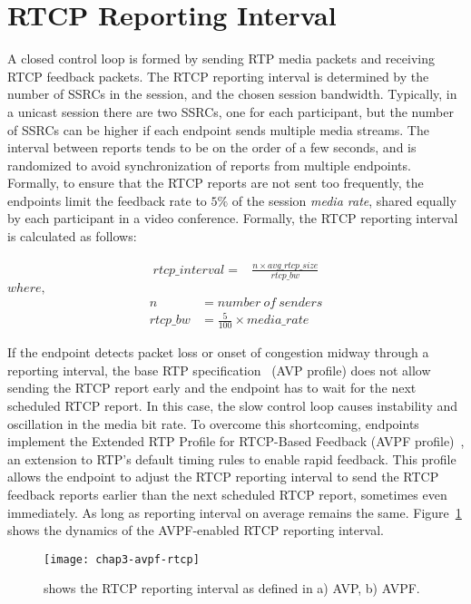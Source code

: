\section{RTCP Reporting Interval}

A closed control loop is formed by sending RTP media packets and receiving
RTCP feedback packets. The RTCP reporting interval is determined by the number
of SSRCs in the session, and the chosen session bandwidth. Typically, in a
unicast session there are two SSRCs, one for each participant, but the number
of SSRCs can be higher if each endpoint sends multiple media streams. The
interval between reports tends to be on the order of a few seconds, and is
randomized to avoid synchronization of reports from multiple endpoints.
Formally, to ensure that the RTCP reports are not sent too frequently, the
endpoints limit the feedback rate to $5\%$ of the session \textit{media rate},
shared equally by each participant in a video conference. Formally, the RTCP
reporting interval is calculated as follows:

\begin{align}
rtcp\_interval = & \frac{n \times avg\_rtcp\_size}{rtcp\_bw}
\label{eq:rtcp.int}
\end{align}
\hspace{35mm}$where,$
\begin{align*}
n &=  number\ of\ senders \\
rtcp\_bw &=  \frac{5}{100} \times media\_rate
\end{align*}



If the endpoint detects packet loss or onset of congestion midway through a
reporting interval, the base RTP specification~\cite{rfc3550} (AVP profile)
does not allow sending the RTCP report early and the endpoint has to wait for
the next scheduled RTCP report. In this case, the slow control loop causes
instability and oscillation in the media bit rate. To overcome this
shortcoming, endpoints implement the Extended RTP Profile for RTCP-Based
Feedback (AVPF profile)~\cite{rfc4585}, an extension to RTP's default timing
rules to enable rapid feedback. This profile allows the endpoint to adjust the
RTCP reporting interval to send the RTCP feedback reports earlier than the
next scheduled RTCP report, sometimes even immediately. As long as reporting
interval on average remains the same. Figure~\ref{fig:3:avpf.interval} shows
the dynamics of the AVPF-enabled RTCP reporting interval.

\begin{figure}[!h]
\centerline{\texttt{[image: chap3-avpf-rtcp]}}
\caption{shows the RTCP reporting interval as defined in a) AVP, b) AVPF.}
\label{fig:3:avpf.interval}
\end{figure}


